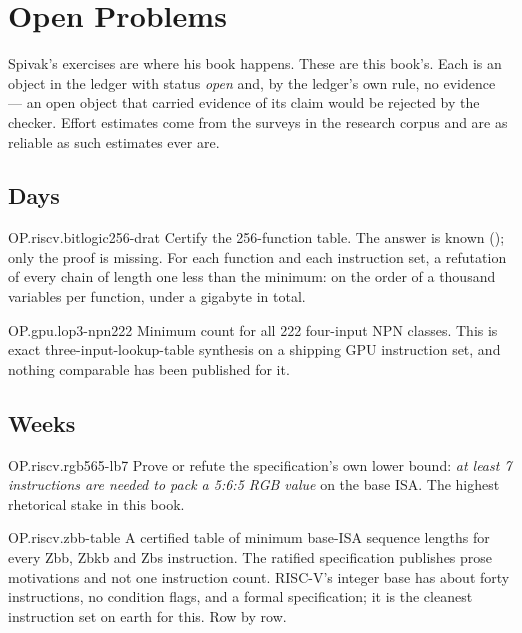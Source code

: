 \chapter{Open Problems}
\label{ch:open}

Spivak's exercises are where his book happens. These are this book's. Each is an object in the ledger with status \emph{open} and, by the ledger's own rule, no evidence --- an open object that carried evidence of its claim would be rejected by the checker. Effort estimates come from the surveys in the research corpus and are as reliable as such estimates ever are.

\section{Days}

\begin{artifact}{OP.riscv.bitlogic256-drat}
Certify the 256-function table. The answer is known (); only the proof is missing. For each function and each instruction set, a refutation of every chain of length one less than the minimum: on the order of a thousand variables per function, under a gigabyte in total.
\end{artifact}

\begin{artifact}{OP.gpu.lop3-npn222}
Minimum  count for all 222 four-input NPN classes. This is exact three-input-lookup-table synthesis on a shipping GPU instruction set, and nothing comparable has been published for it.
\end{artifact}

\section{Weeks}

\begin{artifact}{OP.riscv.rgb565-lb7}
Prove or refute the specification's own lower bound: \emph{at least 7 instructions are needed to pack a 5:6:5 RGB value} on the base ISA. The highest rhetorical stake in this book.
\end{artifact}

\begin{artifact}{OP.riscv.zbb-table}
A certified table of minimum base-ISA sequence lengths for every Zbb, Zbkb and Zbs instruction. The ratified specification publishes prose motivations and not one instruction count. RISC-V's integer base has about forty instructions, no condition flags, and a formal specification; it is the cleanest instruction set on earth for this. Row by row.
\end{artifact}

